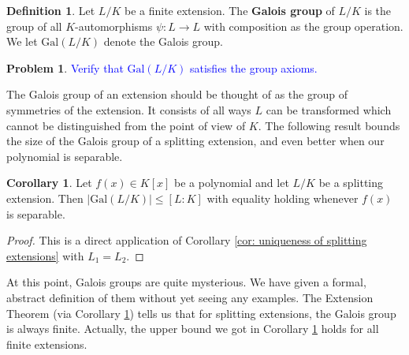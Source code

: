 \documentclass[11pt]{article}
\def\gal{\mathrm{Gal}}
\theoremstyle{definition}
\newtheorem{corollary}[theorem]{Corollary}
\newtheorem{definition}[theorem]{Definition}
\newtheorem{problem}{Problem}[section]
\numberwithin{equation}{subsection}
\newcommand{\blue}[1]{\textcolor{blue}{#1}}
\begin{document}
\begin{definition}
    Let $L/K$ be a finite extension.
    The \textbf{Galois group} of $L/K$ is the group of all $K$-automorphisms $\psi : L \to L$ with composition as the group operation.
    We let $\gal(L/K)$ denote the Galois group.
\end{definition}

\begin{problem}
    \blue{Verify that $\gal(L/K)$ satisfies the group axioms.}
\end{problem}

The Galois group of an extension should be thought of as the group of symmetries of the extension.
It consists of all ways $L$ can be transformed which cannot be distinguished from the point of view of $K$.
The following result bounds the size of the Galois group of a splitting extension, and even better when our polynomial is separable.

\begin{corollary}
\label{cor: Galois order}
    Let $f(x) \in K[x]$ be a polynomial and let $L/K$ be a splitting extension.
    Then $|\gal(L/K)| \leq [L : K]$ with equality holding whenever $f(x)$ is separable.
\end{corollary}

\begin{proof}
    This is a direct application of Corollary \ref{cor: uniqueness of splitting extensions} with $L_1 = L_2$.
\end{proof}

At this point, Galois groups are quite mysterious.
We have given a formal, abstract definition of them without yet seeing any examples.
The Extension Theorem (via Corollary \ref{cor: Galois order}) tells us that for splitting extensions, the Galois group is always finite.
Actually, the upper bound we got in Corollary \ref{cor: Galois order} holds for all finite extensions.
\end{document}
